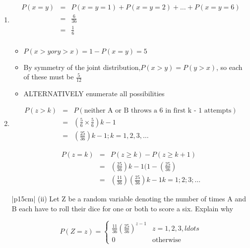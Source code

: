 \documentclass[a4paper,12pt]{article}
\begin{document}
\begin{enumerate}
    \item 
    
\begin{eqnarray*}
P(x = y) &=& P(x = y = 1) + P(x = y = 2) + \ldots + P(x = y = 6)\\ 
&=& \frac{6}{36}\\
&=& \frac{1}{6}\\
\end{eqnarray*}

\begin{itemize}
    \item $P(x > y or y > x) = 1 - P(x = y) = 5$
\item By symmetry of the joint distribution,$P(x > y) = P(y > x)$, so each of these must be $ \frac{5}{12}$
\item ALTERNATIVELY enumerate all possibilities
\end{itemize}

\item 
\begin{eqnarray*}
P(z > k) &=& P(\mbox{neither A or B throws a 6 in first k - 1 attempts})\\
&=& (\frac{5}{6} \times \frac{5}{6} )k-1 \\
&=& (\frac{25}{36} )k-1; k = 1, 2, 3, \ldots
\end{eqnarray*}

\begin{eqnarray*}
P(z = k) &=& P(z \geq k) - P(z \geq k + 1)\\
&=& ( \frac{25}{36} )k-1(1 -  \left( \frac{25}{36} \right) \\
&=& ( \frac{11}{36} )( \frac{25}{36} )k-1 k = 1; 2; 3; \ldots
\end{eqnarray*}

    
  \begin{table}[ht!]
     \centering
     \begin{tabular}{|p{15cm}|}
     \hline  
(ii) Let Z be a random variable denoting the number of times A and B each have to roll their dice for one or both to score a six.  Explain why 
 
\[   P(Z=z) = \begin{cases}  \frac{11}{36} \left( \frac{25}{36} \right)^{z-1} & z= 1,2,3,ldots \\
0 & \mbox{otherwise} \end{cases}\]

 
 \\ \hline 
      \end{tabular}
    \end{table}
    

\end{enumerate}
\end{document}

